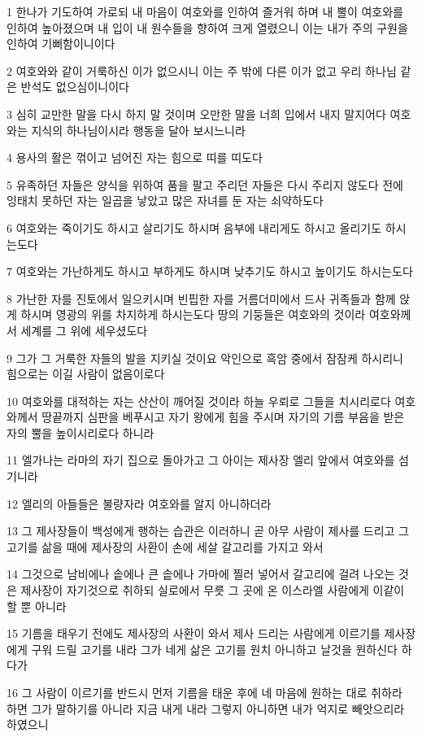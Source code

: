 \par 1 한나가 기도하여 가로되 내 마음이 여호와를 인하여 즐거워 하며 내 뿔이 여호와를 인하여 높아졌으며 내 입이 내 원수들을 향하여 크게 열렸으니 이는 내가 주의 구원을 인하여 기뻐함이니이다
\par 2 여호와와 같이 거룩하신 이가 없으시니 이는 주 밖에 다른 이가 없고 우리 하나님 같은 반석도 없으심이니이다
\par 3 심히 교만한 말을 다시 하지 말 것이며 오만한 말을 너희 입에서 내지 말지어다 여호와는 지식의 하나님이시라 행동을 달아 보시느니라
\par 4 용사의 활은 꺾이고 넘어진 자는 힘으로 띠를 띠도다
\par 5 유족하던 자들은 양식을 위하여 품을 팔고 주리던 자들은 다시 주리지 않도다 전에 잉태치 못하던 자는 일곱을 낳았고 많은 자녀를 둔 자는 쇠약하도다
\par 6 여호와는 죽이기도 하시고 살리기도 하시며 음부에 내리게도 하시고 올리기도 하시는도다
\par 7 여호와는 가난하게도 하시고 부하게도 하시며 낮추기도 하시고 높이기도 하시는도다
\par 8 가난한 자를 진토에서 일으키시며 빈핍한 자를 거름더미에서 드사 귀족들과 함께 앉게 하시며 영광의 위를 차지하게 하시는도다 땅의 기둥들은 여호와의 것이라 여호와께서 세계를 그 위에 세우셨도다
\par 9 그가 그 거룩한 자들의 발을 지키실 것이요 악인으로 흑암 중에서 잠잠케 하시리니 힘으로는 이길 사람이 없음이로다
\par 10 여호와를 대적하는 자는 산산이 깨어질 것이라 하늘 우뢰로 그들을 치시리로다 여호와께서 땅끝까지 심판을 베푸시고 자기 왕에게 힘을 주시며 자기의 기름 부음을 받은 자의 뿔을 높이시리로다 하니라
\par 11 엘가나는 라마의 자기 집으로 돌아가고 그 아이는 제사장 엘리 앞에서 여호와를 섬기니라
\par 12 엘리의 아들들은 불량자라 여호와를 알지 아니하더라
\par 13 그 제사장들이 백성에게 행하는 습관은 이러하니 곧 아무 사람이 제사를 드리고 그 고기를 삶을 때에 제사장의 사환이 손에 세살 갈고리를 가지고 와서
\par 14 그것으로 남비에나 솥에나 큰 솥에나 가마에 찔러 넣어서 갈고리에 걸려 나오는 것은 제사장이 자기것으로 취하되 실로에서 무릇 그 곳에 온 이스라엘 사람에게 이같이 할 뿐 아니라
\par 15 기름을 태우기 전에도 제사장의 사환이 와서 제사 드리는 사람에게 이르기를 제사장에게 구워 드릴 고기를 내라 그가 네게 삶은 고기를 원치 아니하고 날것을 원하신다 하다가
\par 16 그 사람이 이르기를 반드시 먼저 기름을 태운 후에 네 마음에 원하는 대로 취하라 하면 그가 말하기를 아니라 지금 내게 내라 그렇지 아니하면 내가 억지로 빼앗으리라 하였으니
